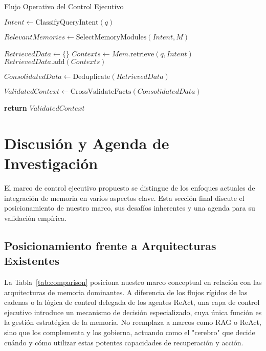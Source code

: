 \documentclass[journal,onecolumn]{IEEEtran}
\begin{document}
\begin{algorithm}[h!]
\caption{Flujo Operativo del Control Ejecutivo}
\label{alg:control_flow}
\begin{algorithmic}[1]
        \Statex {}
        \State $Intent \gets \text{ClassifyQueryIntent}(q)$
        
        \Statex {}
        \State $RelevantMemories \gets \text{SelectMemoryModules}(Intent, M)$
        
        \Statex {}
        \State $RetrievedData \gets \{\}$
            \State $Contexts \gets Mem.\text{retrieve}(q, Intent)$
            \State $RetrievedData.\text{add}(Contexts)$
        \EndFor
        
        \Statex {}
        \State $ConsolidatedData \gets \text{Deduplicate}(RetrievedData)$
        
        \Statex {}
        \State $ValidatedContext \gets \text{CrossValidateFacts}(ConsolidatedData)$
        
        \Statex {}
        \State \textbf{return} $ValidatedContext$
    \EndProcedure
\end{algorithmic}
\end{algorithm}


\section{Discusión y Agenda de Investigación}

El marco de control ejecutivo propuesto se distingue de los enfoques actuales de integración de memoria en varios aspectos clave. Esta sección final discute el posicionamiento de nuestro marco, sus desafíos inherentes y una agenda para su validación empírica.

\subsection{Posicionamiento frente a Arquitecturas Existentes}
La Tabla~\ref{tab:comparison} posiciona nuestro marco conceptual en relación con las arquitecturas de memoria dominantes. A diferencia de los flujos rígidos de las cadenas o la lógica de control delegada de los agentes ReAct, una capa de control ejecutivo introduce un mecanismo de decisión especializado, cuya única función es la gestión estratégica de la memoria. No reemplaza a marcos como RAG o ReAct, sino que los complementa y los gobierna, actuando como el "cerebro" que decide cuándo y cómo utilizar estas potentes capacidades de recuperación y acción.
\end{document}
